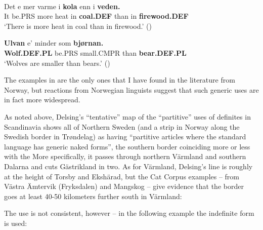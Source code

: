 \z

\ea\label{}
\label{bkm:Ref135628619}{}{}\\
	\ea
		\gll	Det  e  mer  varme  i  \textbf{kola} enn  i  \textbf{veden.}\\
				It  be.PRS  more  heat  in  \textbf{coal.DEF} than  in  \textbf{firewood.DEF}\\
		\glt	‘There is more heat in coal than in firewood.’ (\citet[19]{Iversen1918})

	\ex
		\gll	\textbf{Ulvan} e’  minder  som  \textbf{bjørnan.}\\
				\textbf{Wolf.DEF.PL} be.PRS  small.CMPR  than  \textbf{bear.DEF.PL}\\
				
		\glt	‘Wolves are smaller than bears.’ (\citet[18]{Iversen1918})
	\z 
\z

The examples in  are the only ones that I have found in the literature from Norway, but reactions from Norwegian linguists suggest that such generic uses are in fact more widespread. 

As noted above, Delsing’s “tentative” map of the “partitive” uses of definites in Scandinavia shows all of Northern Sweden (and a strip in Norway along the Swedish border in Trøndelag) as having “partitive articles where the standard language has generic naked forms”, the southern border coinciding more or less with the  More specifically, it passes through northern Värmland and southern Dalarna and cuts Gästrikland in two. As for Värmland, Delsing’s line is roughly at the height of Torsby and Ekshärad, but the Cat Corpus examples – from Västra Ämtervik (Fryksdalen) and Mangskog – give evidence that the border goes at least 40-50 kilometers further south in Värmland: 

\ea
	\z 
\z

The use is not consistent, however – in the following example the indefinite form is used:

